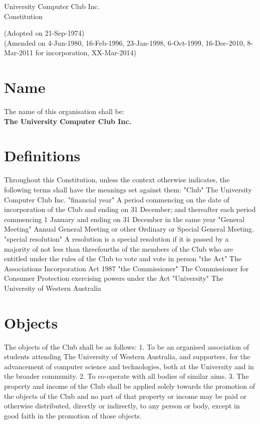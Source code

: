 \documentclass[12pt]{article} %
\begin{document}
\noindent
\begin{center}
\LARGE{University Computer Club Inc.}\\
\Large{Constitution}
\end{center}

\noindent
\small{(Adopted on 21-Sep-1974)\\
(Amended on 4-Jun-1980, 16-Feb-1996, 23-Jan-1998, 6-Oct-1999, 16-Dec-2010, 8-Mar-2011 for incorporation, XX-Mar-2014)\\}

\begingroup
	\let\cleardoublepage\clearpage
	\def\addvspace#1{}
	\tableofcontents
\endgroup


\section{Name}
The name of this organisation shall be:\\
\large{\textbf{The University Computer Club Inc.}}

\section{Definitions}
Throughout this Constitution, unless the context otherwise indicates, the following terms shall
have the meanings set against them:
"Club"
The University Computer Club Inc.
"financial year"
A period commencing on the date of incorporation of the Club and ending on 31
December; and thereafter each period commencing 1 January and ending on 31
December in the same year
"General Meeting"
Annual General Meeting or other Ordinary or Special General Meeting.
"special resolution"
A resolution is a special resolution if it is passed by a majority of not less than threefourths
of the members of the Club who are entitled under the rules of the Club to
vote and vote in person
"the Act"
The Associations Incorporation Act 1987
"the Commissioner"
The Commissioner for Consumer Protection exercising powers under the Act
"University"
The University of Western Australia

\section{Objects}
The objects of the Club shall be as follows:
1. To be an organised association of students attending The University of Western
Australia, and supporters, for the advancement of computer science and technologies,
both at the University and in the broader community.
2. To co-operate with all bodies of similar aims.
3. The property and income of the Club shall be applied solely towards the promotion of
the objects of the Club and no part of that property or income may be paid or
otherwise distributed, directly or indirectly, to any person or body, except in good
faith in the promotion of those objects.
\end{document}
